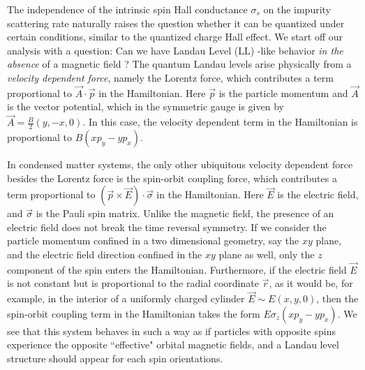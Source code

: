 \documentclass[prl,aps,amssymb,shownopacs,twocolumn]{revtex4}
\begin{document}
The independence of the intrinsic spin Hall conductance $\sigma_s$
on the impurity scattering rate naturally raises the question
whether it can be quantized under certain conditions, similar to the
quantized charge Hall effect. We start off our analysis with a
question: Can we have Landau Level (LL) -like behavior \emph{in the
absence} of a magnetic field \cite{haldane1988}? The quantum Landau
levels arise physically from a {\it velocity dependent force},
namely the Lorentz force, which contributes a term proportional to
$\vec{A}\cdot \vec{p}$ in the Hamiltonian. Here $\vec{p}$ is the
particle momentum and $\vec{A}$ is the vector potential, which in
the symmetric gauge is given by $\vec{A} = \frac{B}{2}(y, -x,0)$. In
this case, the velocity dependent term in the Hamiltonian is
proportional to $B(xp_y-yp_x)$.

In condensed matter systems, the only other ubiquitous velocity
dependent force besides the Lorentz force is the spin-orbit coupling
force, which contributes a term proportional to $(\vec{p} \times
\vec{E})\cdot \vec{\sigma}$ in the Hamiltonian. Here $\vec{E}$ is
the electric field, and $\vec{\sigma}$ is the Pauli spin matrix.
Unlike the magnetic field, the presence of an electric field does
not break the time reversal symmetry. If we consider the particle
momentum confined in a two dimensional geometry, say the $xy$ plane,
and the electric field direction confined in the $xy$ plane as well,
only the $z$ component of the spin enters the Hamiltonian.
Furthermore, if the electric field $\vec{E}$ is not constant but is
proportional to the radial coordinate $\vec{r}$, as it would be, for
example, in the interior of a uniformly charged cylinder $\vec{E}
\sim E(x,y,0)$, then the spin-orbit coupling term in the Hamiltonian
takes the form $E \sigma_z (xp_y-yp_x)$. We see that this system
behaves in such a way as if particles with opposite spins experience
the opposite ``effective" orbital magnetic fields, and a Landau
level structure should appear for each spin orientations.
\end{document}
